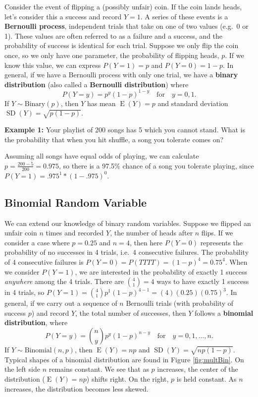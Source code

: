 \documentclass[
]{krantz}
\newcommand{\E}{\operatorname{E}}
\newcommand{\SD}{\operatorname{SD}}
\begin{document}
Consider the event of flipping a (possibly unfair) coin. If the coin lands heads, let's consider this a success and record \(Y = 1\).
A series of these events is a \textbf{Bernoulli process}, independent trials that take on one of two values (e.g.~0 or 1). These values are often referred to as a failure and a success, and the probability of success is identical for each trial.
Suppose we only flip the coin once, so we only have one parameter, the probability of flipping heads, \(p\). If we know this value, we can express \(P(Y=1) = p\) and \(P(Y=0) = 1-p\). In general, if we have a Bernoulli process with only one trial, we have a \textbf{binary distribution} (also called a \textbf{Bernoulli distribution}) where
\begin{equation} 
P(Y = y) = p^y(1-p)^{1-y} \quad \textrm{for} \quad y = 0, 1.
\label{eq:binaryRV}
\end{equation}
If \(Y \sim \textrm{Binary}(p)\), then \(Y\) has mean \(\E(Y) = p\) and standard deviation \(\SD(Y) = \sqrt{p(1-p)}\).

\textbf{Example 1:} Your playlist of 200 songs has 5 which you cannot stand. What is the probability that when you hit shuffle, a song you tolerate comes on?

Assuming all songs have equal odds of playing, we can calculate \(p = \frac{200-5}{200} = 0.975\), so there is a 97.5\% chance of a song you tolerate playing, since \(P(Y=1)=.975^1*(1-.975)^0\).

\hypertarget{sec-binomial}{%
\subsection{Binomial Random Variable}\label{sec-binomial}}

We can extend our knowledge of binary random variables. Suppose we flipped an unfair coin \(n\) times and recorded \(Y\), the number of heads after \(n\) flips. If we consider a case where \(p = 0.25\) and \(n = 4\), then here \(P(Y=0)\) represents the probability of no successes in 4 trials, i.e.~4 consecutive failures. The probability of 4 consecutive failures is \(P(Y = 0) = P(TTTT) = (1-p)^4 = 0.75^4\). When we consider \(P(Y = 1)\), we are interested in the probability of exactly 1 success \emph{anywhere} among the 4 trials. There are \(\binom{4}{1} = 4\) ways to have exactly 1 success in 4 trials, so \(P(Y = 1) = \binom{4}{1}p^1(1-p)^{4-1} = (4)(0.25)(0.75)^3\). In general, if we carry out a sequence of \(n\) Bernoulli trials (with probability of success \(p\)) and record \(Y\), the total number of successes, then \(Y\) follows a \textbf{binomial distribution}, where
\begin{equation}
P(Y=y) = \binom{n}{y} p^y (1-p)^{n-y} \quad \textrm{for} \quad y = 0, 1, \ldots, n.
\label{eq:binomRV}
\end{equation}
If \(Y \sim \textrm{Binomial}(n,p)\), then \(\E(Y) = np\) and \(\SD(Y) = \sqrt{np(1-p)}\).
Typical shapes of a binomial distribution are found in Figure \ref{fig:multBin}. On the left side \(n\) remains constant. We see that as \(p\) increases, the center of the distribution (\(\E(Y) = np\)) shifts right. On the right, \(p\) is held constant. As \(n\) increases, the distribution becomes less skewed.
\end{document}
